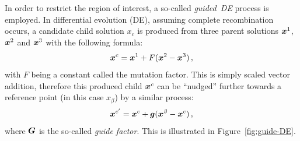 In order to restrict the region of interest, a so-called \emph{guided~DE} process is employed. In differential evolution (DE), assuming complete recombination occurs, a candidate child solution $x_c$ is produced from three parent solutions $\boldsymbol{x}^1$, $\boldsymbol{x}^2$ and $\boldsymbol{x}^3$ with the following formula:
\begin{equation}
\boldsymbol{x}^c = \boldsymbol{x}^1 + F(\boldsymbol{x}^2 - \boldsymbol{x}^3)\,,
\end{equation}
with $F$ being a constant called the mutation factor. This is simply scaled vector addition, therefore this produced child $\boldsymbol{x}^c$ can be ``nudged'' further towards a reference point (in this case $x_\beta$) by a similar process:
\begin{equation}\label{eq:nudge}
\boldsymbol{x}^{c'} = \boldsymbol{x}^c + \boldsymbol{g}(\boldsymbol{x}^\beta - \boldsymbol{x}^c)\,,
\end{equation}
where $\boldsymbol{G}$ is the so-called \emph{guide factor}. This is illustrated in Figure~\ref{fig:guide-DE}.

